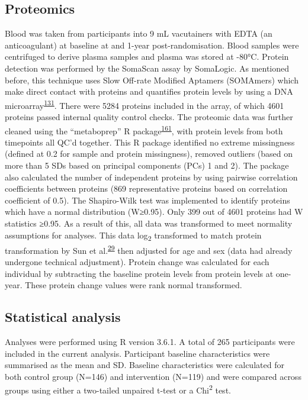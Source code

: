 \documentclass[11pt,twoside]{bristolthesis}
\begin{document}
\hypertarget{proteomics}{%
\subsection{Proteomics}\label{proteomics}}

Blood was taken from participants into 9 mL vacutainers with EDTA (an anticoagulant) at baseline at and 1-year post-randomisation. Blood samples were centrifuged to derive plasma samples and plasma was stored at -80°C. Protein detection was performed by the SomaScan assay by SomaLogic. As mentioned before, this technique uses Slow Off-rate Modified Aptamers (SOMAmers) which make direct contact with proteins and quantifies protein levels by using a DNA microarray\textsuperscript{\protect\hyperlink{ref-Rohloff2014}{131}}. There were 5284 proteins included in the array, of which 4601 proteins passed internal quality control checks. The proteomic data was further cleaned using the ``metaboprep'' R package\textsuperscript{\protect\hyperlink{ref-Hughes2021}{161}}, with protein levels from both timepoints all QC'd together. This R package identified no extreme missingness (defined at 0.2 for sample and protein missingness), removed outliers (based on more than 5 SDs based on principal components (PCs) 1 and 2). The package also calculated the number of independent proteins by using pairwise correlation coefficients between proteins (869 representative proteins based on correlation coefficient of 0.5). The Shapiro-Wilk test was implemented to identify proteins which have a normal distribution (W≥0.95). Only 399 out of 4601 proteins had W statistics ≥0.95. As a result of this, all data was transformed to meet normality assumptions for analyses. This data log\textsubscript{2} transformed to match protein transformation by Sun et al.\textsuperscript{\protect\hyperlink{ref-Sun2018}{29}} then adjusted for age and sex (data had already undergone technical adjustment). Protein change was calculated for each individual by subtracting the baseline protein levels from protein levels at one-year. These protein change values were rank normal transformed.

\hypertarget{statistical-analysis-1}{%
\subsection{Statistical analysis}\label{statistical-analysis-1}}

Analyses were performed using R version 3.6.1. A total of 265 participants were included in the current analysis. Participant baseline characteristics were summarised as the mean and SD. Baseline characteristics were calculated for both control group (N=146) and intervention (N=119) and were compared across groups using either a two-tailed unpaired t-test or a Chi\textsuperscript{2} test.
\end{document}
